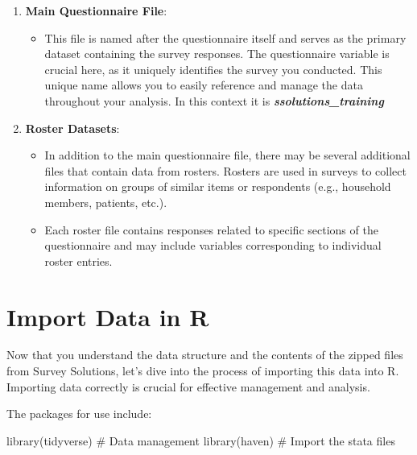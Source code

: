 \documentclass[
  letterpaper,
  DIV=11,
  numbers=noendperiod]{scrreprt}
\newenvironment{Shaded}{\begin{snugshade}}{\end{snugshade}}
\newcommand{\CommentTok}[1]{\textcolor[rgb]{0.37,0.37,0.37}{#1}}
\newcommand{\FunctionTok}[1]{\textcolor[rgb]{0.28,0.35,0.67}{#1}}
\newcommand{\NormalTok}[1]{\textcolor[rgb]{0.00,0.23,0.31}{#1}}
\providecommand{\tightlist}{%
  \setlength{\itemsep}{0pt}\setlength{\parskip}{0pt}}\usepackage{longtable,booktabs,array}
\begin{document}
\begin{enumerate}
\def\labelenumi{\arabic{enumi}.}
\item
  \textbf{Main Questionnaire File}:

  \begin{itemize}
  \tightlist
  \item
    This file is named after the questionnaire itself and serves as the
    primary dataset containing the survey responses. The questionnaire
    variable is crucial here, as it uniquely identifies the survey you
    conducted. This unique name allows you to easily reference and
    manage the data throughout your analysis. In this context it is
    \textbf{\emph{ssolutions\_training}}
  \end{itemize}
\item
  \textbf{Roster Datasets}:

  \begin{itemize}
  \item
    In addition to the main questionnaire file, there may be several
    additional files that contain data from rosters. Rosters are used in
    surveys to collect information on groups of similar items or
    respondents (e.g., household members, patients, etc.).
  \item
    Each roster file contains responses related to specific sections of
    the questionnaire and may include variables corresponding to
    individual roster entries.
  \end{itemize}
\end{enumerate}

\section{Import Data in R}\label{import-data-in-r}

Now that you understand the data structure and the contents of the
zipped files from Survey Solutions, let's dive into the process of
importing this data into R. Importing data correctly is crucial for
effective management and analysis.

The packages for use include:

\begin{Shaded}
\begin{Highlighting}[]
\FunctionTok{library}\NormalTok{(tidyverse)          }\CommentTok{\# Data management}
\FunctionTok{library}\NormalTok{(haven)              }\CommentTok{\# Import the stata files}
\end{Highlighting}
\end{Shaded}
\end{document}
